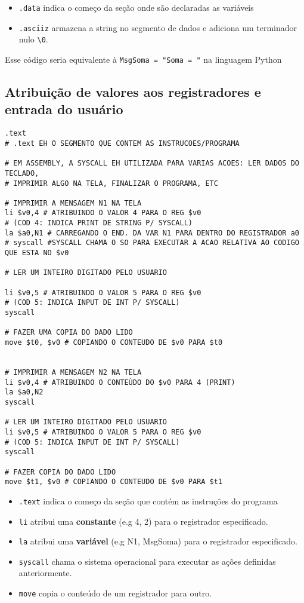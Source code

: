 \documentclass{article}
\begin{document}
\begin{itemize}
    \item \texttt{.data} indica o começo da seção onde são declaradas as variáveis
    \item \texttt{.asciiz} armazena a string no segmento de dados e adiciona um terminador nulo \texttt{\textbackslash0}.
\end{itemize}
Esse código seria equivalente à \texttt{MsgSoma = "Soma = "} na linguagem Python

\subsection{Atribuição de valores aos registradores e entrada do usuário}
\begin{verbatim}
.text
# .text EH O SEGMENTO QUE CONTEM AS INSTRUCOES/PROGRAMA

# EM ASSEMBLY, A SYSCALL EH UTILIZADA PARA VARIAS ACOES: LER DADOS DO TECLADO, 
# IMPRIMIR ALGO NA TELA, FINALIZAR O PROGRAMA, ETC

# IMPRIMIR A MENSAGEM N1 NA TELA
li $v0,4 # ATRIBUINDO O VALOR 4 PARA O REG $v0 
# (COD 4: INDICA PRINT DE STRING P/ SYSCALL)
la $a0,N1 # CARREGANDO O END. DA VAR N1 PARA DENTRO DO REGISTRADOR a0
# syscall #SYSCALL CHAMA O SO PARA EXECUTAR A ACAO RELATIVA AO CODIGO QUE ESTA NO $v0

# LER UM INTEIRO DIGITADO PELO USUARIO

li $v0,5 # ATRIBUINDO O VALOR 5 PARA O REG $v0 
# (COD 5: INDICA INPUT DE INT P/ SYSCALL) 
syscall

# FAZER UMA COPIA DO DADO LIDO
move $t0, $v0 # COPIANDO O CONTEUDO DE $v0 PARA $t0


# IMPRIMIR A MENSAGEM N2 NA TELA
li $v0,4 # ATRIBUINDO O CONTEÚDO DO $v0 PARA 4 (PRINT)
la $a0,N2
syscall

# LER UM INTEIRO DIGITADO PELO USUARIO
li $v0,5 # ATRIBUINDO O VALOR 5 PARA O REG $v0 
# (COD 5: INDICA INPUT DE INT P/ SYSCALL) 
syscall

# FAZER COPIA DO DADO LIDO
move $t1, $v0 # COPIANDO O CONTEUDO DE $v0 PARA $t1
\end{verbatim}

\begin{itemize}
    \item \texttt{.text} indica o começo da seção que contém as instruções do programa
    \item \texttt{li} atribui uma \textbf{constante} (e.g 4, 2) para o registrador especificado.
    \item \texttt{la} atribui uma \textbf{variável} (e.g N1, MsgSoma) para o registrador especificado.
    \item \texttt{syscall} chama o sistema operacional para executar as ações definidas anteriormente.
    \item \texttt{move} copia o conteúdo de um registrador para outro.
\end{itemize}
\end{document}

